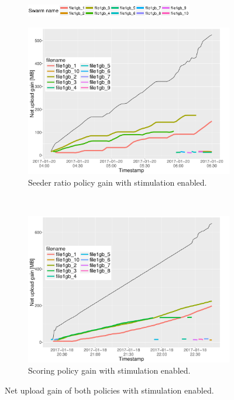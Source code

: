 \begin{figure}[h]
	\begin{adjustwidth}{-1.5cm}{}
		\begin{subfigure}[t]{1.2\textwidth}
			\centering
			\includegraphics[width=0.8\textwidth]{pics/results/legends.eps}
		\end{subfigure}
		\begin{subfigure}[b]{0.6\textwidth}
			\vspace{-0.2cm}
			\centering
			\includegraphics[width=\textwidth]{pics/results/simple3_sr_trig.pdf}
			\caption{Seeder ratio policy gain with stimulation enabled.}
			\label{fig:simplesrtrig}
		\end{subfigure}
		~
		\begin{subfigure}[b]{0.6\textwidth}
			\vspace{-0.2cm}
			\centering
			\includegraphics[width=\textwidth]{pics/results/simple1_scsr_trig.pdf}
			\caption{Scoring policy gain with stimulation enabled.}
			\label{fig:simplescsrtrig}
		\end{subfigure}
		\caption{Net upload gain of both policies with stimulation enabled.}
	\end{adjustwidth}
\end{figure}


